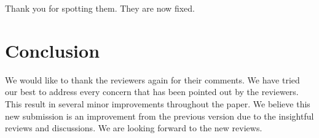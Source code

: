\documentclass[a4paper,twoside,10pt]{reviewresponse}
\begin{document}

Thank you for spotting them. They are now fixed.

\section{Conclusion}
We would like to thank the reviewers again for their comments.
We have tried our best to address every concern that has been pointed out by the reviewers. This result in several minor improvements throughout the paper.
We believe this new submission is an improvement from the previous version due to the insightful reviews and discussions. We are looking forward to the new reviews.

%


\end{document}
